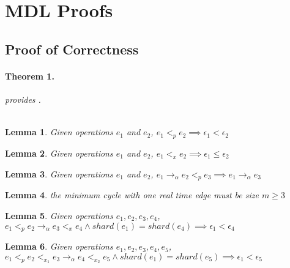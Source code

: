 \newpage
\usepackage[english]{babel}
\newtheorem{theorem}{Theorem}[section]
\newtheorem{corollary}{Corollary}[theorem]
\newtheorem{lemma}[theorem]{Lemma}

\section{MDL Proofs}
\label{sec:proofs}

\subsection{Proof of Correctness}

\paragraph{Theorem 1.} \textit{\protocol provides \mdl.}
\\
\\

\begin{lemma}
\label{lemma:pred_epoch_order}
    Given operations $e_1$ and $e_2$, $e_1 <_p e_2 \implies \epsilon_1 < \epsilon_2$
\end{lemma}

\begin{lemma}
\label{lemma:shard_epoch_order}
    Given operations $e_1$ and $e_2$, $e_1 <_x e_2 \implies \epsilon_1 \leq \epsilon_2$
\end{lemma}

\begin{lemma}
    Given operations $e_1$ and $e_2$, $e_1 \rightarrow_\alpha e_2 <_p e_3 \implies e_1 \rightarrow_\alpha e_3$
\end{lemma}

\begin{lemma}
    the minimum cycle with one real time edge must be size $m \geq 3$
\end{lemma}

\begin{lemma}
    Given operations $e_1, e_2, e_3, e_4$, $e_1 <_p e_2 \rightarrow_\alpha e_3 <_x e_4 \land shard(e_1) = shard(e_4) \implies \epsilon_1 < \epsilon_4$
\end{lemma}

\begin{lemma}
    Given operations $e_1, e_2, e_3, e_4, e_5$, $e_1 <_p e_2 <_{x_1} e_3 \rightarrow_\alpha e_4 <_{x_2} e_5 \land shard(e_1) = shard(e_5) \implies \epsilon_1 < \epsilon_5$
\end{lemma}